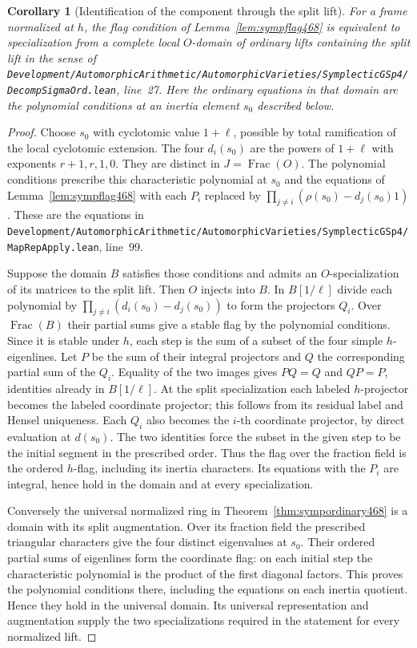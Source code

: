 \documentclass[a4paper,11pt]{article}
\newtheorem{corollary}[proposition]{Corollary}
\theoremstyle{definition}
\theoremstyle{remark}
\newcommand{\srcloc}[2]{{\small\nolinkurl{#1.lean}}, line~#2}
\numberwithin{equation}{section}
\begin{document}
\begin{corollary}[Identification of the component through the split lift]\leavevmode
\label{cor:sympcomponent468}
For a frame normalized at \(h\), the flag condition of
Lemma~\ref{lem:sympflag468} is equivalent to specialization from
a complete local \(O\)-domain of ordinary lifts containing the
split lift in the sense of
\srcloc{Development/AutomorphicArithmetic/AutomorphicVarieties/SymplecticGSp4/DecompSigmaOrd}{27}.
Here the ordinary equations in that domain are the polynomial
conditions at an inertia element \(s_0\) described below.
\end{corollary}
\begin{proof}
Choose \(s_0\) with cyclotomic value \(1+\ell\), possible by
total ramification of the local cyclotomic extension. The four
\(d_i(s_0)\) are the powers of \(1+\ell\) with exponents
\(r+1,r,1,0\). They are distinct in \(J=\operatorname{Frac}(O)\).
The polynomial conditions prescribe this characteristic polynomial
at \(s_0\) and the equations of Lemma~\ref{lem:sympflag468} with
each \(P_i\) replaced by
\(\prod_{j\ne i}(\rho(s_0)-d_j(s_0)1)\). These are the equations in
\srcloc{Development/AutomorphicArithmetic/AutomorphicVarieties/SymplecticGSp4/MapRepApply}{99}.

Suppose the domain \(B\) satisfies those conditions and admits an
\(O\)-specialization of its matrices to the split lift. Then \(O\)
injects into \(B\). In \(B[1/\ell]\) divide each polynomial by
\(\prod_{j\ne i}(d_i(s_0)-d_j(s_0))\) to form the projectors \(Q_i\).
Over \(\operatorname{Frac}(B)\) their partial sums give a stable
flag by the polynomial conditions. Since it is stable under \(h\),
each step is the sum of a subset of the four simple \(h\)-eigenlines.
Let \(P\) be the sum of their integral projectors and \(Q\) the
corresponding partial sum of the \(Q_i\). Equality of the two images
gives \(PQ=Q\) and \(QP=P\), identities already in \(B[1/\ell]\).
At the split specialization each labeled \(h\)-projector becomes the
labeled coordinate projector; this follows from its residual label
and Hensel uniqueness. Each \(Q_i\) also becomes the \(i\)-th
coordinate projector, by direct evaluation at \(d(s_0)\). The two
identities force the subset in the given step to be the initial
segment in the prescribed order. Thus the flag over the fraction
field is the ordered \(h\)-flag, including its inertia characters.
Its equations with the \(P_i\) are integral, hence hold in the
domain and at every specialization.

Conversely the universal normalized ring in
Theorem~\ref{thm:sympordinary468} is a domain with its split
augmentation. Over its fraction field the prescribed triangular
characters give the four distinct eigenvalues at \(s_0\).
Their ordered partial sums of eigenlines form the coordinate flag:
on each initial step the characteristic polynomial is the product
of the first diagonal factors. This proves the polynomial conditions
there, including the equations on each inertia quotient. Hence
they hold in the universal domain. Its universal representation
and augmentation supply the two specializations required in the
statement for every normalized lift.
\end{proof}
\end{document}

